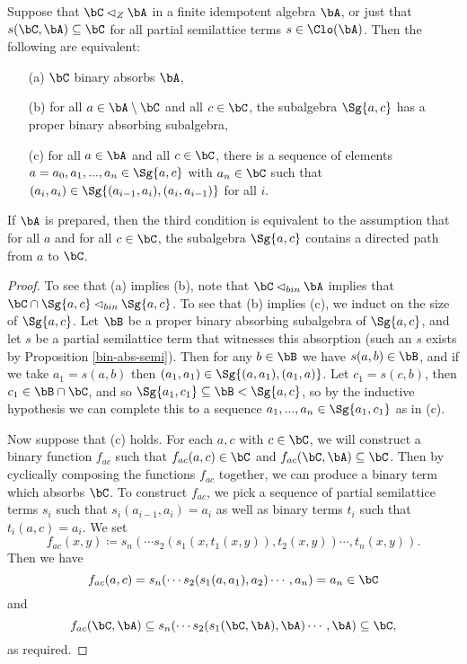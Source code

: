 \begin{prop}\label{bin-central-criterion} Suppose that $\bC \lhd_Z \bA$ in a finite idempotent algebra $\bA$, or just that $s(\bC,\bA) \subseteq \bC$ for all partial semilattice terms $s \in \Clo(\bA)$. Then the following are equivalent:
\begin{itemize}
\item[(a)] $\bC$ binary absorbs $\bA$,
\item[(b)] for all $a \in \bA\setminus \bC$ and all $c \in \bC$, the subalgebra $\Sg\{a,c\}$ has a proper binary absorbing subalgebra,
\item[(c)] for all $a \in \bA$ and all $c \in \bC$, there is a sequence of elements $a = a_0, a_1, ..., a_n \in \Sg\{a,c\}$ with $a_n \in \bC$ such that $(a_i,a_i) \in \Sg\{(a_{i-1},a_i),(a_i,a_{i-1})\}$ for all $i$.
\end{itemize}
If $\bA$ is prepared, then the third condition is equivalent to the assumption that for all $a$ and for all $c \in \bC$, the subalgebra $\Sg\{a,c\}$ contains a directed path from $a$ to $\bC$.
\end{prop}
\begin{proof} To see that (a) implies (b), note that $\bC \lhd_{bin} \bA$ implies that $\bC \cap \Sg\{a,c\} \lhd_{bin} \Sg\{a,c\}$. To see that (b) implies (c), we induct on the size of $\Sg\{a,c\}$. Let $\bB$ be a proper binary absorbing subalgebra of $\Sg\{a,c\}$, and let $s$ be a partial semilattice term that witnesses this absorption (such an $s$ exists by Proposition \ref{bin-abs-semi}). Then for any $b \in \bB$ we have $s(a,b) \in \bB$, and if we take $a_1 = s(a,b)$ then $(a_1,a_1) \in \Sg\{(a,a_1),(a_1,a)\}$. Let $c_1 = s(c,b)$, then $c_1 \in \bB \cap \bC$, and so $\Sg\{a_1,c_1\} \subseteq \bB < \Sg\{a,c\}$, so by the inductive hypothesis we can complete this to a sequence $a_1, ..., a_n \in \Sg\{a_1,c_1\}$ as in (c).

Now suppose that (c) holds. For each $a,c$ with $c \in \bC$, we will construct a binary function $f_{ac}$ such that $f_{ac}(a,c) \in \bC$ and $f_{ac}(\bC,\bA) \subseteq \bC$. Then by cyclically composing the functions $f_{ac}$ together, we can produce a binary term which absorbs $\bC$. To construct $f_{ac}$, we pick a sequence of partial semilattice terms $s_i$ such that $s_i(a_{i-1},a_i) = a_i$ as well as binary terms $t_i$ such that $t_i(a,c) = a_i$. We set
\[
f_{ac}(x,y) \coloneqq s_n(\cdots s_2(s_1(x,t_1(x,y)),t_2(x,y))\cdots,t_n(x,y)).
\]
Then we have
\[
f_{ac}(a,c) = s_n(\cdots s_2(s_1(a,a_1),a_2)\cdots,a_n) = a_n \in \bC
\]
and
\[
f_{ac}(\bC,\bA) \subseteq s_n(\cdots s_2(s_1(\bC,\bA),\bA)\cdots,\bA) \subseteq \bC,
\]
as required.
\end{proof}

